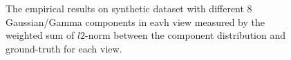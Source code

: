 \documentclass[11pt]{article}
\begin{document}
\begin{figure}
\caption{The empirical results on synthetic dataset with different 8 Gaussian/Gamma components in eavh view measured by the weighted sum of $l2$-norm between the component distribution and ground-truth for each view.}
\end{figure}




\end{document}
